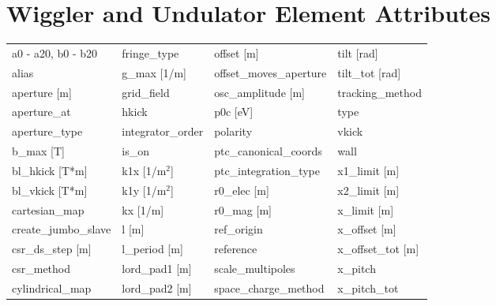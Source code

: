  \section{Wiggler and Undulator Element Attributes}
 \label{s:list.wiggler}
 
 \begin{tabular}{llll} \toprule
a0 - a20, b0 - b20               & fringe_type                      & offset [m]                       & tilt [rad]                       \\
alias                            & g_max [1/m]                      & offset_moves_aperture            & tilt_tot [rad]                   \\
aperture [m]                     & grid_field                       & osc_amplitude [m]                & tracking_method                  \\
aperture_at                      & hkick                            & p0c [eV]                         & type                             \\
aperture_type                    & integrator_order                 & polarity                         & vkick                            \\
b_max [T]                        & is_on                            & ptc_canonical_coords             & wall                             \\
bl_hkick [T*m]                   & k1x [1/m$^2$]                    & ptc_integration_type             & x1_limit [m]                     \\
bl_vkick [T*m]                   & k1y [1/m$^2$]                    & r0_elec [m]                      & x2_limit [m]                     \\
cartesian_map                    & kx [1/m]                         & r0_mag [m]                       & x_limit [m]                      \\
create_jumbo_slave               & l [m]                            & ref_origin                       & x_offset [m]                     \\
csr_ds_step [m]                  & l_period [m]                     & reference                        & x_offset_tot [m]                 \\
csr_method                       & lord_pad1 [m]                    & scale_multipoles                 & x_pitch                          \\
cylindrical_map                  & lord_pad2 [m]                    & space_charge_method              & x_pitch_tot                      \\

\end{tabular}
